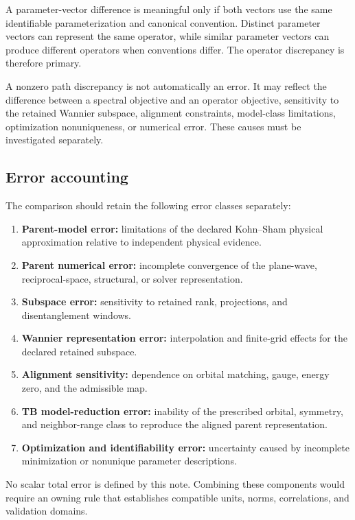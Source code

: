 A parameter-vector difference is meaningful only if both vectors use the same
identifiable parameterization and canonical convention. Distinct parameter
vectors can represent the same operator, while similar parameter vectors can
produce different operators when conventions differ. The operator discrepancy
is therefore primary.

A nonzero path discrepancy is not automatically an error. It may reflect the
difference between a spectral objective and an operator objective, sensitivity
to the retained Wannier subspace, alignment constraints, model-class
limitations, optimization nonuniqueness, or numerical error. These causes must
be investigated separately.

\subsection*{Error accounting}

The comparison should retain the following error classes separately:
\begin{enumerate}
    \item \textbf{Parent-model error:} limitations of the declared Kohn--Sham
          physical approximation relative to independent physical evidence.
    \item \textbf{Parent numerical error:} incomplete convergence of the
          plane-wave, reciprocal-space, structural, or solver representation.
    \item \textbf{Subspace error:} sensitivity to retained rank, projections,
          and disentanglement windows.
    \item \textbf{Wannier representation error:} interpolation and finite-grid
          effects for the declared retained subspace.
    \item \textbf{Alignment sensitivity:} dependence on orbital matching,
          gauge, energy zero, and the admissible map.
    \item \textbf{TB model-reduction error:} inability of the prescribed
          orbital, symmetry, and neighbor-range class to reproduce the aligned
          parent representation.
    \item \textbf{Optimization and identifiability error:} uncertainty caused
          by incomplete minimization or nonunique parameter descriptions.
\end{enumerate}
No scalar total error is defined by this note. Combining these components would
require an owning rule that establishes compatible units, norms, correlations,
and validation domains.

